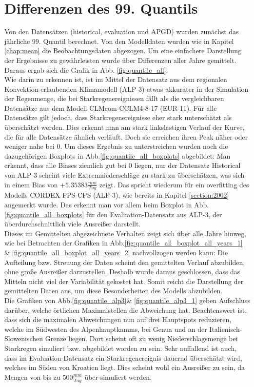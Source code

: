 \section{Differenzen des 99. Quantils}
Von den Datensätzen (historical, evaluation und APGD) wurden zunächst das jährliche 99. Quantil berechnet. Von den Modelldaten wurden wie in Kapitel \ref{chap:mean} die Beobachtungsdaten abgezogen. Um eine einfachere Darstellung der Ergebnisse zu gewährleisten wurde über Differenzen aller Jahre gemittelt. Daraus ergab sich die Grafik in Abb. \ref{fig:quantile_all}. \\
Wie darin zu erkennen ist, ist im Mittel der Datensatz aus dem regionalen Konvektion-erlaubenden Klimamodell (ALP-3) etwas akkurater in der Simulation der Regenmenge, die bei Starkregenereignissen fällt als die vergleichbaren Datensätze aus dem Modell CLMcom-CCLM4-8-17 (EUR-11). Für alle Datensätze gilt jedoch, dass Starkregenereignisse eher stark unterschätzt als überschätzt werden. Dies erkennt man am stark linkslastigen Verlauf der Kurve, die für alle Datensätze ähnlich verläuft. Doch sie erreichen ihren Peak näher oder weniger nahe bei $0$. Um dieses Ergebnis zu unterstreichen wurden noch die dazugehörigen Boxplots in Abb.\ref{fig:quantile_all_boxplots} abgebildet: Man erkennt, dass alle Biases ziemlich gut bei $0$ liegen, nur der Datensatz Historical von ALP-3 scheint viele Extremniederschläge zu stark zu überschätzen, was sich in einem Bias von $+5.35383 \frac{mm}{Tag}$ zeigt. Das spricht wiederum für ein overfitting des Modells CORDEX FPS-CPS (ALP-3), wie bereits in Kapitel \ref{section:2002} angemerkt wurde. Das erkennt man vor allem beim Boxplot in Abb.\ref{fig:quantile_all_boxplots} für den Evaluation-Datensatz aus ALP-3, der überdurchschnittlich viele Ausreißer darstellt. \\
Dieses im Gemittelten abgezeichnete Verhalten zeigt sich über alle Jahre hinweg, wie bei Betrachten der Grafiken in Abb.\ref{fig:quantile_all_boxplot_all_years_1} \& \ref{fig:quantile_all_boxplot_all_years_2} nachvollzogen werden kann: Die Aufteilung bzw. Streuung der Daten scheint den gemittelten Verlauf abzubilden, ohne große Ausreißer darzustellen. Deshalb wurde daraus geschlossen, dass das Mitteln nicht viel der Variabilität gekostet hat. Somit reicht die Darstellung der gemittelten Daten aus, um diese Besonderheiten des Modells abzubilden.\\
Die Grafiken von Abb.\ref{fig:quantile_alp3}\& \ref{fig:quantile_alp3_1} geben Aufschluss darüber, welche örtlichen Maximalstellen die Abweichung hat. Beachtenswert ist, dass sich die maximalen Abweichungen nun auf drei Hauptspots reduzieren, welche im Südwesten des Alpenhauptkamms, bei Genua und an der Italienisch-Slowenischen Grenze liegen. Dort scheint oft zu wenig Niederschlagsmenge bei Starkregen simuliert bzw. abgebildet worden zu sein. Sehr auffallend ist auch, dass im Evaluation-Datensatz ein Starkregenereignis dauernd überschätzt wird, welches im Süden von Kroatien liegt. Dies scheint wohl ein Ausreißer zu sein, da Mengen von bis zu $500 \frac{mm}{Tag}$ über-simuliert werden.\\

